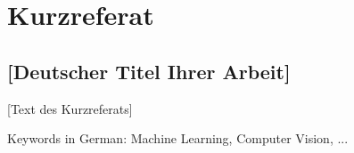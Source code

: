 \section{Kurzreferat}

\subsection{[Deutscher Titel Ihrer Arbeit]}

[Text des Kurzreferats]
\vspace{0.5cm}

\noindent
Keywords in German: Machine Learning, Computer Vision, ...
